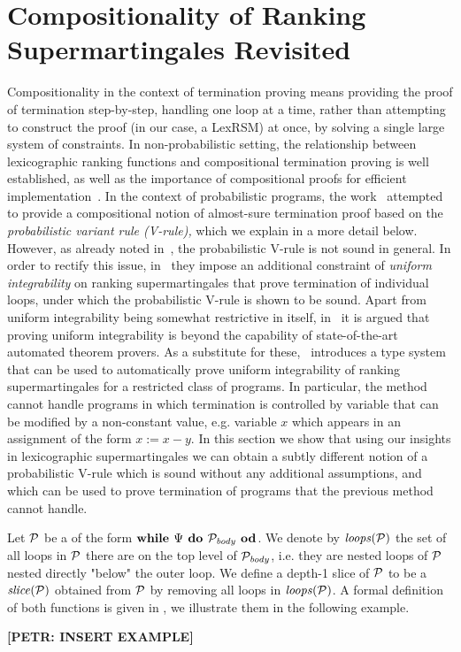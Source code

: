 \section{Compositionality of Ranking Supermartingales Revisited}
\label{sec:compositional}

Compositionality in the context of termination proving means providing the 
proof of termination step-by-step, handling one loop at a time, rather than 
attempting to construct the proof (in our case, a LexRSM) at once, by solving a 
single large system of constraints. In non-probabilistic setting, the 
relationship between lexicographic ranking functions and compositional 
termination proving is well established, as well as the importance of 
compositional proofs for efficient implementation~\cite{xxx}. In the context of 
probabilistic programs, the work~\cite{HolgerPOPL} attempted to provide a 
compositional notion of almost-sure termination proof based on the 
\emph{probabilistic variant rule (V-rule),} which we explain in a more detail 
below. 
However, as already noted in~\cite{HolgerPOPL}, the probabilistic V-rule is not 
sound in general. In order to rectify this issue, in~\cite{HolgerPOPL} they 
impose an additional constraint of \emph{uniform integrability} on ranking 
supermartingales that prove termination of individual loops, 
under which the probabilistic V-rule is shown to be sound. Apart from uniform 
integrability being somewhat restrictive in itself, in~\cite{HolgerPOPL} it is 
argued that proving uniform integrability is beyond the capability of 
state-of-the-art automated theorem provers. As a substitute for 
these,~\cite{HolgerPOPL} introduces a type system that can be used to 
automatically prove 
uniform integrability of ranking supermartingales for a restricted class of 
programs. In particular, the method cannot handle programs in which termination 
is controlled by variable that can be modified by a non-constant value, e.g. 
variable $x$ which appears in an assignment of the form $x:=x-y$. In this 
section we show that using our insights in lexicographic supermartingales we 
can obtain a subtly different notion of a probabilistic V-rule which is sound 
without any additional assumptions, and which can be used to prove termination 
of programs that the previous method cannot handle. 

Let $\mathcal{P}$ be a \PP{} of the form $\textbf{while } \Psi \textbf{ do } 
\mathcal{P}_{\mathit{body}} \textbf{ od}$. We denote by $\mathit{loops}(\mathcal{P})$ the set of all 
loops in $\mathcal{P}$ there are on the top level of $\mathcal{P}_{\mathit{body}}$, i.e. they are 
nested loops of $\mathcal{P}$ nested directly "below" the outer loop. We define a 
depth-1 slice of $\mathcal{P}$ to be a \PP{} $\mathit{slice}(\mathcal{P})$ obtained from 
$\mathcal{P}$ by removing all loops in $\mathit{loops}(\mathcal{P})$. A formal definition of 
both functions is given in \AppendixMaterial, we illustrate them in the 
following example.

\textbf{[PETR: INSERT EXAMPLE]}


